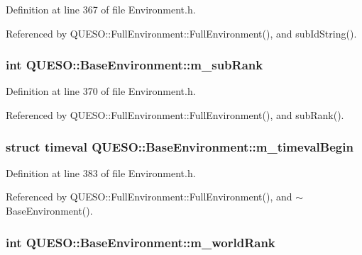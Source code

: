 Definition at line 367 of file Environment.\-h.



Referenced by Q\-U\-E\-S\-O\-::\-Full\-Environment\-::\-Full\-Environment(), and sub\-Id\-String().

\hypertarget{class_q_u_e_s_o_1_1_base_environment_acecae0962d56bae97b6476c7514b428f}{
\subsubsection[{m\-\_\-sub\-Rank}]{\setlength{\rightskip}{0pt plus 5cm}int Q\-U\-E\-S\-O\-::\-Base\-Environment\-::m\-\_\-sub\-Rank\hspace{0.3cm}{\ttfamily [protected]}}}\label{class_q_u_e_s_o_1_1_base_environment_acecae0962d56bae97b6476c7514b428f}


Definition at line 370 of file Environment.\-h.



Referenced by Q\-U\-E\-S\-O\-::\-Full\-Environment\-::\-Full\-Environment(), and sub\-Rank().

\hypertarget{class_q_u_e_s_o_1_1_base_environment_a7b2842a4eb78bcae522cf4f9a5634279}{
\subsubsection[{m\-\_\-timeval\-Begin}]{\setlength{\rightskip}{0pt plus 5cm}struct timeval Q\-U\-E\-S\-O\-::\-Base\-Environment\-::m\-\_\-timeval\-Begin\hspace{0.3cm}{\ttfamily [protected]}}}\label{class_q_u_e_s_o_1_1_base_environment_a7b2842a4eb78bcae522cf4f9a5634279}


Definition at line 383 of file Environment.\-h.



Referenced by Q\-U\-E\-S\-O\-::\-Full\-Environment\-::\-Full\-Environment(), and $\sim$\-Base\-Environment().

\hypertarget{class_q_u_e_s_o_1_1_base_environment_a464cab923ada0e14c6e3a4000c2ea385}{
\subsubsection[{m\-\_\-world\-Rank}]{\setlength{\rightskip}{0pt plus 5cm}int Q\-U\-E\-S\-O\-::\-Base\-Environment\-::m\-\_\-world\-Rank\hspace{0.3cm}{\ttfamily [protected]}}}\label{class_q_u_e_s_o_1_1_base_environment_a464cab923ada0e14c6e3a4000c2ea385}


